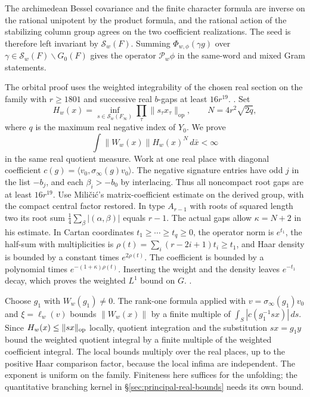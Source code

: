 The archimedean Bessel covariance and the finite character
formula are inverse on the rational unipotent by the product
formula, and the rational action of the stabilizing column
group agrees on the two coefficient realizations. The seed is
therefore left invariant by \(\mathcal S_w(F)\).
Summing \(\Phi_{w,\phi}(\gamma g)\) over
\(\gamma\in\mathcal S_w(F)\backslash G_0(F)\) gives
the operator \(\mathcal P_w\phi\) in the same-word and mixed Gram
statements.

The orbital proof uses the weighted integrability of the
chosen real section on the family with \(r\ge1801\) and
successive real \(b\)-gaps at least \(16r^{19}\).
.
Set
\[
 H_w(x)=\inf_{s\in \mathcal S_w(F_\infty)}
                        \prod_{\tau}\|s_\tau x_\tau\|_{\mathrm{op}},
 \qquad N=4r^2\sqrt{2q},
\]
where \(q\) is the maximum real negative index of \(Y_0\).
We prove
\[
 \int\|W_w(x)\|H_w(x)^N\,d\bar x<\infty
\]
in the same real quotient measure. Work at one real place with
diagonal coefficient \(c(g)=\langle v_0,\sigma_\infty(g)v_0\rangle\).
The negative signature entries have odd \(j\) in the list \(-b_j\),
and each \(\beta_i>-b_0\) by interlacing. Thus all noncompact root gaps
are at least \(16r^{19}\). Use Mili\v{c}i\'c's matrix-coefficient
estimate on the derived group, with the compact central factor
restored. In type \(A_{r-1}\) with roots of squared length two its
root sum \(\frac14\sum_\beta|(\alpha,\beta)|\) equals \(r-1\).
The actual gaps allow \(\kappa=N+2\) in his estimate.
In Cartan coordinates \(t_1\ge\cdots\ge t_q\ge0\), the operator norm is
\(e^{t_1}\), the half-sum with multiplicities is
\(\rho(t)=\sum_i(r-2i+1)t_i\ge t_1\), and Haar density is bounded by
a constant times \(e^{2\rho(t)}\). The coefficient is bounded by a
polynomial times \(e^{-(1+\kappa)\rho(t)}\). Inserting the weight and
the density leaves \(e^{-t_1}\) decay, which proves the weighted \(L^1\)
bound on \(G\).
\cite[Part~III, \S3, Theorem~1 and its Cartan form, pp.~84--85]{p2milicic-integrability}
.

Choose \(g_1\) with \(W_w(g_1)\ne0\). The rank-one formula applied
with \(v=\sigma_\infty(g_1)v_0\) and \(\xi=\ell_w(v)\) bounds
\(\|W_w(x)\|\) by a finite multiple of
\(\int_S|c(g_1^{-1}sx)|\,ds\). Since \(H_w(x)\le\|sx\|_{\rm op}\)
locally, quotient integration and the substitution \(sx=g_1y\)
bound the weighted quotient integral by a finite multiple of the
weighted coefficient integral. The local bounds multiply over the
real places, up to the positive Haar comparison factor, because the
local infima are independent. The exponent is uniform on the family.
Finiteness here suffices for the unfolding; the quantitative branching
kernel in \S\ref{sec:principal-real-bounds} needs its own bound.

